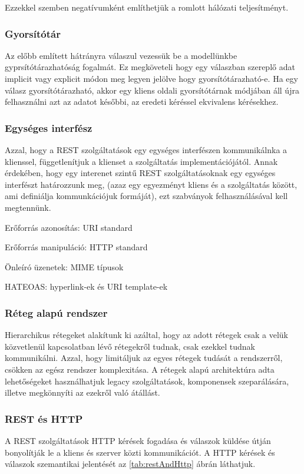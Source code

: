 Ezzekkel szemben negatívumként említhetjük a romlott hálózati teljesítményt.

\subsubsection{Gyorsítótár}

Az előbb említett hátrányra válaszul vezessük be a modellünkbe gyprsítótárazhatóság fogalmát. Ez megköveteli hogy egy válaszban szereplő adat implicit vagy explicit módon meg legyen jelölve hogy gyorsítótárazható-e. Ha egy válasz gyorsítótárazható, akkor egy kliens oldali gyorsítótárnak módjában áll újra felhasználni azt az adatot későbbi, az eredeti kéréssel ekvivalens kérésekhez.

\subsubsection{Egységes interfész}

Azzal, hogy a REST szolgáltatások egy egységes interfészen kommunikálnka a klienssel, függetlenítjuk a klienset a szolgáltatás implementációjától. Annak érdekében, hogy egy interenet szintű REST szolgáltatásoknak egy egységes interfészt határozzunk meg, (azaz egy egyezményt kliens és a szolgáltatás között, ami definiálja kommunkációjuk formáját), ezt szabványok felhasználásával kell megtennünk.

\begin{listing}
	\item Erőforrás azonosítás: URI standard \cite{RFC3986}
	\item Erőforrás manipuláció: HTTP standard \cite{RFC2616}
	\item Önleíró üzenetek: MIME típusok \cite{RFC2045}
	\item HATEOAS: hyperlink-ek és URI template-ek \cite{RFC6570}
\end{listing}

\subsubsection{Réteg alapú rendszer}

Hierarchikus rétegeket alakítunk ki azáltal, hogy az adott rétegek csak a velük közvetlenül kapcsolatban lévő rétegekről tudnak, csak ezekkel tudnak kommunikálni. Azzal, hogy limitáljuk az egyes rétegek tudását a rendszerről, csökken az egész rendszer komplexitása. A rétegek alapú architektúra adta lehetőségeket használhatjuk legacy szolgáltatások, komponensek szeparálására, illetve megkönnyíti az ezekről való átállást.

\subsubsection{REST és HTTP}

A REST szolgáltatások HTTP kérések fogadása és válaszok küldése útján bonyolítják le a kliens és szerver közti kommunikációt. A HTTP kérések és válaszok szemantikai jelentését az \ref{tab:restAndHttp} ábrán láthatjuk.